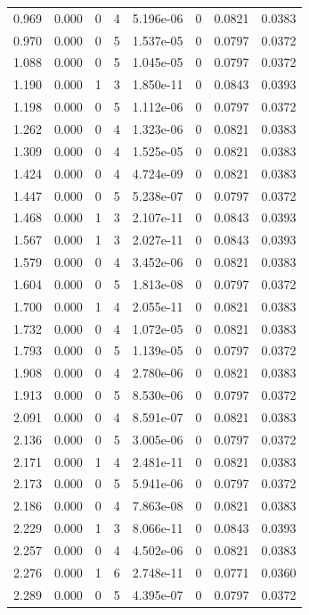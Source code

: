 \documentclass[preview]{standalone}
\begin{document}
{{\begin{tabular}{L{1.2cm}C{1.2cm} C{0.3cm}C{0.5cm} C{1.4cm}C{1.4cm} C{1.4cm}C{1.4cm}}
  0.969  &  0.000  & 0     &  4 &  5.196e-06  & 0  & 0.0821 &  0.0383   \\ 
  0.970  &  0.000  & 0     &  5 &  1.537e-05  & 0  & 0.0797 &  0.0372   \\ 
  1.088  &  0.000  & 0     &  5 &  1.045e-05  & 0  & 0.0797 &  0.0372   \\ 
  1.190  &  0.000  & 1     &  3 &  1.850e-11  & 0  & 0.0843 &  0.0393   \\ 
  1.198  &  0.000  & 0     &  5 &  1.112e-06  & 0  & 0.0797 &  0.0372   \\ 
  1.262  &  0.000  & 0     &  4 &  1.323e-06  & 0  & 0.0821 &  0.0383   \\ 
  1.309  &  0.000  & 0     &  4 &  1.525e-05  & 0  & 0.0821 &  0.0383   \\ 
  1.424  &  0.000  & 0     &  4 &  4.724e-09  & 0  & 0.0821 &  0.0383   \\ 
  1.447  &  0.000  & 0     &  5 &  5.238e-07  & 0  & 0.0797 &  0.0372   \\ 
  1.468  &  0.000  & 1     &  3 &  2.107e-11  & 0  & 0.0843 &  0.0393   \\ 
  1.567  &  0.000  & 1     &  3 &  2.027e-11  & 0  & 0.0843 &  0.0393   \\ 
  1.579  &  0.000  & 0     &  4 &  3.452e-06  & 0  & 0.0821 &  0.0383   \\ 
  1.604  &  0.000  & 0     &  5 &  1.813e-08  & 0  & 0.0797 &  0.0372   \\ 
  1.700  &  0.000  & 1     &  4 &  2.055e-11  & 0  & 0.0821 &  0.0383   \\ 
  1.732  &  0.000  & 0     &  4 &  1.072e-05  & 0  & 0.0821 &  0.0383   \\ 
  1.793  &  0.000  & 0     &  5 &  1.139e-05  & 0  & 0.0797 &  0.0372   \\ 
  1.908  &  0.000  & 0     &  4 &  2.780e-06  & 0  & 0.0821 &  0.0383   \\ 
  1.913  &  0.000  & 0     &  5 &  8.530e-06  & 0  & 0.0797 &  0.0372   \\ 
  2.091  &  0.000  & 0     &  4 &  8.591e-07  & 0  & 0.0821 &  0.0383   \\ 
  2.136  &  0.000  & 0     &  5 &  3.005e-06  & 0  & 0.0797 &  0.0372   \\ 
  2.171  &  0.000  & 1     &  4 &  2.481e-11  & 0  & 0.0821 &  0.0383   \\ 
  2.173  &  0.000  & 0     &  5 &  5.941e-06  & 0  & 0.0797 &  0.0372   \\ 
  2.186  &  0.000  & 0     &  4 &  7.863e-08  & 0  & 0.0821 &  0.0383   \\ 
  2.229  &  0.000  & 1     &  3 &  8.066e-11  & 0  & 0.0843 &  0.0393   \\ 
  2.257  &  0.000  & 0     &  4 &  4.502e-06  & 0  & 0.0821 &  0.0383   \\ 
  2.276  &  0.000  & 1     &  6 &  2.748e-11  & 0  & 0.0771 &  0.0360   \\ 
  2.289  &  0.000  & 0     &  5 &  4.395e-07  & 0  & 0.0797 &  0.0372   \\ 
\hline 
\end{tabular} 

}}
\end{document}
